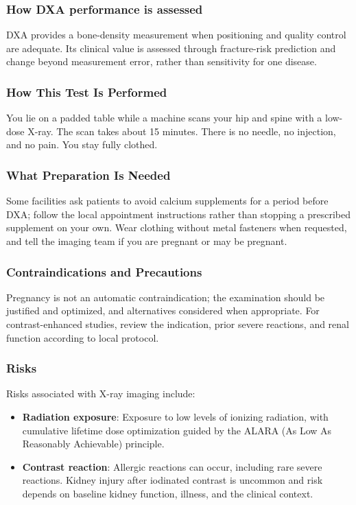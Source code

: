\subsubsection*{How DXA performance is assessed}
DXA provides a bone-density measurement when positioning and quality control are adequate. Its clinical value is assessed through fracture-risk prediction and change beyond measurement error, rather than sensitivity for one disease.

\subsubsection*{How This Test Is Performed}
You lie on a padded table while a machine scans your hip and spine with a low-dose X-ray. The scan takes about 15 minutes. There is no needle, no injection, and no pain. You stay fully clothed.

\subsubsection*{What Preparation Is Needed}
Some facilities ask patients to avoid calcium supplements for a period before DXA; follow the local appointment instructions rather than stopping a prescribed supplement on your own. Wear clothing without metal fasteners when requested, and tell the imaging team if you are pregnant or may be pregnant.

\subsubsection*{Contraindications and Precautions}
Pregnancy is not an automatic contraindication; the examination should be justified and optimized, and alternatives considered when appropriate. For contrast-enhanced studies, review the indication, prior severe reactions, and renal function according to local protocol.

\subsubsection*{Risks}
Risks associated with X-ray imaging include:
\begin{itemize}
    \item \textbf{Radiation exposure}: Exposure to low levels of ionizing radiation, with cumulative lifetime dose optimization guided by the ALARA (As Low As Reasonably Achievable) principle.
    \item \textbf{Contrast reaction}: Allergic reactions can occur, including rare severe reactions. Kidney injury after iodinated contrast is uncommon and risk depends on baseline kidney function, illness, and the clinical context.
\end{itemize}


